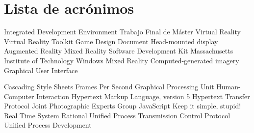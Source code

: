 \chapter{Lista de acrónimos}
{
\small
\begin{acronym}[XXXXXXXX]

     {Integrated Development Environment}
     {Trabajo Final de Máster}
      {Virtual Reality}
    {Virtual Reality Toolkit}
     {Game Design Document}
     {Head-mounted display}
      {Augmented Reality}
      {Mixed Reality}
     {Software Development Kit}
     {Massachusetts Institute of Technology}
     {Windows Mixed Reality}
     {Computed-generated imagery}
     {Graphical User Interface}  


     {Cascading Style Sheets}
     {Frames Per Second}
     {Graphical Processing Unit}
     {Human-Computer Interaction}
   {Hypertext Markup Language, version 5}
    {Hypertext Transfer Protocol}  
    {Joint Photographic Experts Group}
      {JavaScript}
    {Keep it simple, stupid!} 
     {Real Time System}
     {Rational Unified Process}
     {Transmission Control Protocol}  
     {Unified Process Development}

\end{acronym}
}




